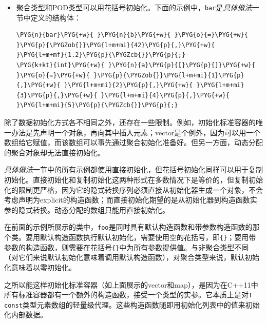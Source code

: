 \begin{itemize}

\item 聚合类型和POD类型可以用花括号初始化。下面的示例中，\texttt{bar}是\textit{具体做法}一节中定义的结构体：



\begin{codeblockbg}
\begin{Verbatim}[commandchars=\\\{\},breaklines=true,breakanywhere=true,fontsize=\codefont,xleftmargin=17bp]
\PYG{n}{bar}\PYG{+w}{ }\PYG{n}{b}\PYG{+w}{ }\PYG{o}{=}\PYG{+w}{ }\PYG{p}{\PYGZob{}}\PYG{l+m+mi}{42}\PYG{p}{,}\PYG{+w}{ }\PYG{l+m+mf}{1.2}\PYG{p}{\PYGZcb{}}\PYG{p}{;}
\PYG{k+kt}{int}\PYG{+w}{ }\PYG{n}{a}\PYG{p}{[}\PYG{p}{]}\PYG{+w}{ }\PYG{o}{=}\PYG{+w}{ }\PYG{p}{\PYGZob{}}\PYG{l+m+mi}{1}\PYG{p}{,}\PYG{+w}{ }\PYG{l+m+mi}{2}\PYG{p}{,}\PYG{+w}{ }\PYG{l+m+mi}{3}\PYG{p}{,}\PYG{+w}{ }\PYG{l+m+mi}{4}\PYG{p}{,}\PYG{+w}{ }\PYG{l+m+mi}{5}\PYG{p}{\PYGZcb{}}\PYG{p}{;}
\end{Verbatim}
\end{codeblockbg}

\end{itemize}



除了数据初始化方式各不相同之外，还存在一些限制。例如，初始化标准容器的唯一办法是先声明一个对象，再向其中插入元素；vector是个例外，因为可以用一个数组给它赋值，而该数组可以事先通过聚合初始化准备好。但另一方面，动态分配的聚合对象却无法直接初始化。



\textit{具体做法}一节中的所有示例都使用直接初始化，但花括号初始化同样可以用于复制初始化。直接初始化和复制初始化这两种形式在多数情况下是等价的，但复制初始化的限制更严格，因为它的隐式转换序列必须直接从初始化器生成一个对象，不会考虑声明为explicit的构造函数；而直接初始化期望的是从初始化器到构造函数实参的隐式转换。动态分配的数组只能用直接初始化。



在前面的示例所展示的类中，\texttt{foo}是同时具有默认构造函数和带参数构造函数的那个类。要用默认构造函数执行默认初始化，需要使用空的花括号，即\texttt{\{\}}；要用带参数的构造函数，则需要在花括号\texttt{\{\}}中为所有参数提供值。与非聚合类型不同（对它们来说默认初始化意味着调用默认构造函数），对聚合类型来说，默认初始化意味着以零初始化。



之所以能这样初始化标准容器（如上面展示的vector和map），是因为在C++11中所有标准容器都有一个额外的构造函数，接受一个类型的实参。它本质上是对\texttt{T const}类型元素数组的轻量级代理。这些构造函数随即用初始化列表中的值来初始化内部数据。


